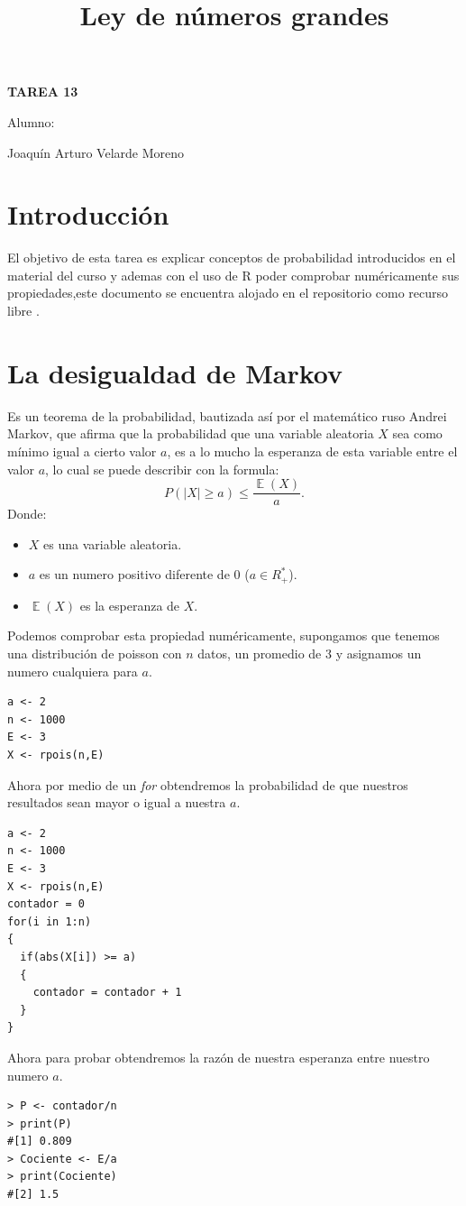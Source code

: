 \documentclass[]{article}
\title{Ley de números grandes}
\date{}
\DeclareMathOperator{\EX}{\mathbb{E}}%
\begin{document}
	\maketitle
	\begin{center}


\centerline{\textbf{TAREA 13} } 
\textbf{ }

\centerline{Alumno: } 
\centerline{Joaquín Arturo Velarde Moreno}


	\end{center}
	

\section{Introducción}

El objetivo de esta tarea es explicar conceptos de probabilidad introducidos en el material del curso \cite{MaterialClase} y ademas con el uso de R poder comprobar numéricamente sus propiedades\cite{rproject},este documento se encuentra alojado en el repositorio\cite{repositorio} como recurso libre .

\section{La desigualdad de Markov}


Es un teorema de la probabilidad, bautizada así por el matemático ruso Andrei Markov, que afirma que la probabilidad que una variable aleatoria $X$ sea como mínimo igual a cierto valor $a$, es a lo mucho la esperanza de esta variable entre el valor $a$, lo cual se puede describir con la formula:
\[ P(\lvert X \lvert \geq a) \leq \frac{\EX(X)}{a}.  \]
Donde:
\begin{itemize}
	\item $X$ es una variable aleatoria.
	\item $a$ es un numero positivo diferente de 0 ($a \in R_{+}^{*}$).
	\item $\EX(X)$ es la esperanza de $X$.
\end{itemize}

Podemos comprobar esta propiedad numéricamente, supongamos que tenemos una distribución de poisson con $n$ datos, un promedio de 3 y asignamos un numero cualquiera para $a$.
  \begin{lstlisting}
a <- 2
n <- 1000
E <- 3
X <- rpois(n,E)
   \end{lstlisting}
Ahora por medio de un \textit{for} obtendremos la probabilidad de que nuestros resultados sean mayor o igual a nuestra $a$.
  \begin{lstlisting}
a <- 2
n <- 1000
E <- 3
X <- rpois(n,E)
contador = 0
for(i in 1:n)
{
  if(abs(X[i]) >= a)
  {
    contador = contador + 1
  }
}
   \end{lstlisting}
Ahora para probar obtendremos la razón de nuestra esperanza entre nuestro numero $a$.
  \begin{lstlisting}
> P <- contador/n
> print(P)
#[1] 0.809
> Cociente <- E/a
> print(Cociente)
#[2] 1.5
   \end{lstlisting}
\end{document}
